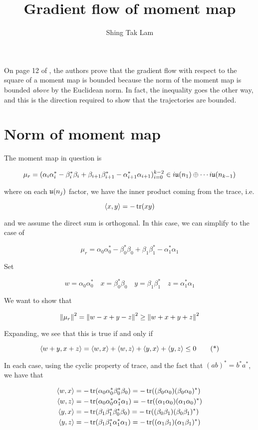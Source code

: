 \documentclass{article}
\title{Gradient flow of moment map}
\author{Shing Tak Lam}
\begin{document}
\maketitle

On page 12 of \cite{kobak_classical_1996}, the authors prove that the gradient flow with respect to the square of a moment map is bounded because the norm of the moment map is bounded \emph{above} by the Euclidean norm. In fact, the inequality goes the other way, and this is the direction required to show that the trajectories are bounded.

\section{Norm of moment map}

The moment map in question is

\[\mu_r = (\alpha_i\alpha_i^* - \beta_i^*\beta_i + \beta_{i+1}\beta_{i+1}^* - \alpha_{i+1}^*\alpha_{i+1})_{i=0}^{k-2} \in i\mathfrak{u}(n_1) \oplus \cdots i\mathfrak{u}(n_{k-1})\]

where on each \(\mathfrak{u}(n_j)\) factor, we have the inner product coming from the trace, i.e.

\[\left\langle x, y \right\rangle = -\tr(xy)\]

and we assume the direct sum is orthogonal. In this case, we can simplify to the case of

\[\mu_r = \alpha_0\alpha_0^* - \beta_0^*\beta_0 + \beta_1\beta_1^* -\alpha_1^*\alpha_1\]

Set

\[w = \alpha_0\alpha_0^* \quad x = \beta_0^*\beta_0 \quad y = \beta_1\beta_1^* \quad z = \alpha_1^*\alpha_1 \]

We want to show that

\[\norm{\mu_r}^2 = \norm{w-x+y-z}^2 \ge \norm{w+x+y+z}^2\]

Expanding, we see that this is true if and only if

\[\left\langle w+y, x + z \right\rangle = \left\langle w, x \right\rangle + \left\langle w, z \right\rangle + \left\langle y, x \right\rangle + \left\langle y, z \right\rangle \le 0 \tag{*}\]

In each case, using the cyclic property of trace, and the fact that \((ab)^* = b^*a^*\), we have that

\begin{align*}
    \left\langle w, x \right\rangle &= -\tr(\alpha_0\alpha_0^*\beta_0^*\beta_0) = -\tr((\beta_0\alpha_0)(\beta_0\alpha_0)^*) \\
    \left\langle w, z \right\rangle &= -\tr(\alpha_0\alpha_0^*\alpha_1^*\alpha_1) = -\tr((\alpha_1\alpha_0)(\alpha_1\alpha_0)^*) \\
    \left\langle y, x \right\rangle &= -\tr(\beta_1\beta_1^*\beta_0^*\beta_0) = -\tr((\beta_0\beta_1)(\beta_0\beta_1)^*) \\
    \left\langle y, z \right\rangle &= -\tr(\beta_1\beta_1^*\alpha_1^*\alpha_1) = -\tr((\alpha_1\beta_1)(\alpha_1\beta_1)^*)
\end{align*}
\end{document}
